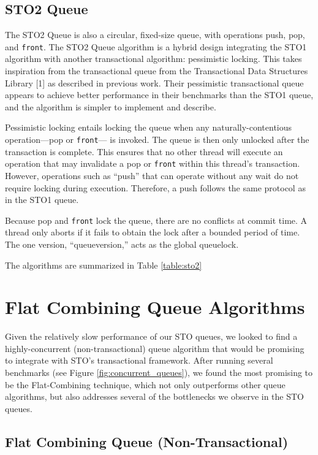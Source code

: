 \subsection{STO2 Queue}
%
The STO2 Queue is also a circular, fixed-size queue, with operations push, pop, and \texttt{front}. The STO2 Queue algorithm is a hybrid design integrating the STO1 algorithm with another transactional algorithm: pessimistic locking. This takes inspiration from the transactional queue from the Transactional Data Structures Library [1] as described in previous work. Their pessimistic transactional queue appears to achieve better performance in their benchmarks than the STO1 queue, and the algorithm is simpler to implement and describe. 

Pessimistic locking entails locking the queue when any naturally-contentious operation---pop or \texttt{front}--- is invoked. The queue is then only unlocked after the transaction is complete. This ensures that no other thread will execute an operation that may invalidate a pop or \texttt{front} within this thread's transaction. However, operations such as ``push'' that can operate without any wait do not require locking during execution. Therefore, a push follows the same protocol as in the STO1 queue.

Because pop and \texttt{front} lock the queue, there are no conflicts at commit time. A thread only aborts if it fails to obtain the lock after a bounded period of time. The one version, “queueversion,” acts as the global queuelock. 

The algorithms are summarized in Table \ref{table:sto2}


\section{Flat Combining Queue Algorithms}
Given the relatively slow performance of our STO queues, we looked to find a highly-concurrent (non-transactional) queue algorithm that would be promising to integrate with STO's transactional framework. After running several benchmarks (see Figure \ref{fig:concurrent_queues}), we found the most promising to be the Flat-Combining technique, which not only outperforms other queue algorithms, but also addresses several of the bottlenecks we observe in the STO queues.

\subsection{Flat Combining Queue (Non-Transactional)}
\label{fcqueuent}

